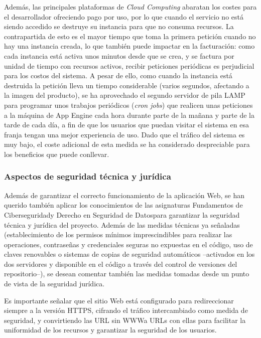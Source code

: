 Además, las principales plataformas de \textit{Cloud Computing} abaratan los costes para el desarrollador ofreciendo pago por uso, por lo que cuando el servicio no está siendo accedido se destruye su instancia para que no consuma recursos. La contrapartida de esto es el mayor tiempo que toma la primera petición cuando no hay una instancia creada, lo que también puede impactar en la facturación: como cada instancia está activa unos minutos desde que se crea, y se factura por unidad de tiempo con recursos activos, recibir peticiones periódicas es perjudicial para los costos del sistema. A pesar de ello, como cuando la instancia está destruida la petición lleva un tiempo considerable (varios segundos, afectando a la imagen del producto), se ha aprovechado el segundo servidor de pila LAMP para programar unos trabajos periódicos (\textit{cron jobs}) que realicen unas peticiones a la máquina de App Engine cada hora durante parte de la mañana y parte de la tarde de cada día, a fin de que los usuarios que puedan visitar el sistema en esa franja tengan una mejor experiencia de uso. Dado que el tráfico del sistema es muy bajo, el coste adicional de esta medida se ha considerado despreciable para los beneficios que puede conllevar.

\subsubsection{Aspectos de seguridad técnica y jurídica}

Además de garantizar el correcto funcionamiento de la aplicación Web, se han querido también aplicar los conocimientos de las asignaturas \guillemotleft Fundamentos de Ciberseguridad\guillemotright\space y \guillemotleft Derecho en Seguridad de Datos\guillemotright\space para garantizar la seguridad técnica y jurídica del proyecto. Además de las medidas técnicas ya señaladas (establecimiento de los permisos mínimos imprescindibles para realizar las operaciones, contraseñas y credenciales seguras no expuestas en el código, uso de claves renovables o sistemas de copias de seguridad automáticos –activados en los dos servidores y disponible en el código a través del control de versiones del repositorio–), se desean comentar también las medidas tomadas desde un punto de vista de la seguridad jurídica.

Es importante señalar que el sitio Web está configurado para redireccionar siempre a la versión HTTPS, cifrando el tráfico intercambiado como medida de seguridad, y convirtiendo las URL sin \guillemotleft WWW\guillemotright\space a URLs con ellas para facilitar la uniformidad de los recursos y garantizar la seguridad de los usuarios.

